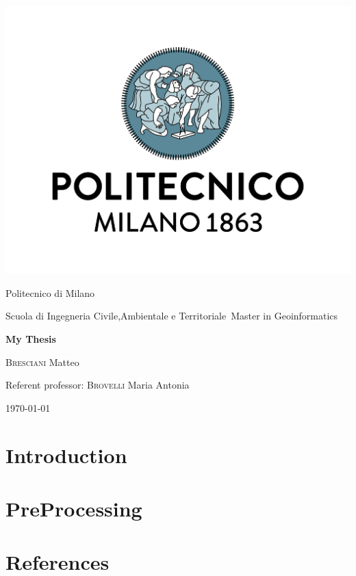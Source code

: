 \documentclass[fontsize=11pt,paper=a4,pagesize=auto]{report}
\begin{document}
\begin{titlepage}
	\centering
	\includegraphics[scale = 0.20]{images/polimi.jpg}\par
	{\Large
		Politecnico di Milano\par
		Scuola di Ingegneria Civile,Ambientale e Territoriale\
		Master in Geoinformatics\par}
			\vspace{0.5cm}
	{\huge\bfseries
		My Thesis\\\par}
	\vspace{1cm}
	{\Large
		{\scshape Bresciani} Matteo\par}
	\vfill
	Referent professor: {\scshape Brovelli} Maria Antonia\par
	\vfill
	{\large\today\par}
\end{titlepage}



\tableofcontents

\chapter{Introduction}


\chapter{PreProcessing}




\chapter{References}

\end{document}
